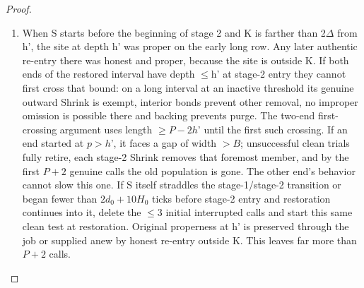 \begin{proof}
\begin{enumerate}
\item When S starts before the beginning of stage 2 and K is farther than 2\(\Delta\) from h', the site at depth h' was proper on the early long row. Any later authentic re-entry there was honest and proper, because the site is outside K. If both ends of the restored interval have depth \(\le\)h' at stage-2 entry they cannot first cross that bound: on a long interval at an inactive threshold its genuine outward Shrink is exempt, interior bonds prevent other removal, no improper omission is possible there and backing prevents purge. The two-end first-crossing argument uses length \(\ge\)\(P- 2h\)' until the first such crossing. If an end started at \(p>h\)', it faces a gap of width \(>B\); unsuccessful clean trials fully retire, each stage-2 Shrink removes that foremost member, and by the first \(P+2\) genuine calls the old population is gone. The other end's behavior cannot slow this one. If S itself straddles the stage-1/stage-2 transition or began fewer than \(2d_0+10H_0\) ticks before stage-2 entry and restoration continues into it, delete the \(\le\)3 initial interrupted calls and start this same clean test at restoration. Original properness at h' is preserved through the job or supplied anew by honest re-entry outside K. This leaves far more than \(P+2\) calls.

\end{enumerate}
\end{proof}
